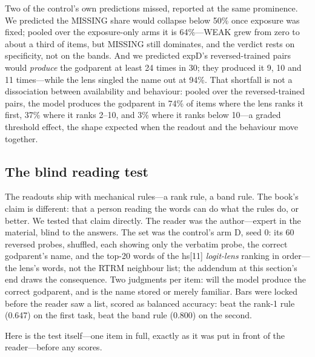 \documentclass[11pt]{article}
\begin{document}
Two of the control's own predictions missed, reported at the same
prominence. We predicted the MISSING share would collapse below 50\%
once exposure was fixed; pooled over the exposure-only arms it is
64\%---WEAK grew from zero to about a third of items, but MISSING
still dominates, and the verdict rests on specificity, not on the
bands. And we predicted expD's reversed-trained pairs would
\emph{produce} the godparent at least 24 times in 30; they produced
it 9, 10 and 11 times---while the lens singled the name out at 94\%.
That shortfall is not a dissociation between availability and
behaviour: pooled over the reversed-trained pairs, the model produces
the godparent in 74\% of items where the lens ranks it first, 37\%
where it ranks 2--10, and 3\% where it ranks below 10---a graded
threshold effect, the shape expected when the readout and the
behaviour move together.

\subsection{The blind reading test}

The readouts ship with mechanical rules---a rank rule, a band rule. The book's claim is different: that a person reading the words can do what the rules do, or better. We tested that claim directly. The reader was the author---expert in the material, blind to the answers. The set was the control's arm D, seed 0: its 60 reversed probes, shuffled, each showing only the verbatim probe, the correct godparent's name, and the top-20 words of the hs[11] \emph{logit-lens} ranking in order---the lens's words, not the RTRM neighbour list; the addendum at this section's end draws the consequence. Two judgments per item: will the model produce the correct godparent, and is the name stored or merely familiar. Bars were locked before the reader saw a list, scored as balanced accuracy: beat the rank-1 rule (0.647) on the first task, beat the band rule (0.800) on the second.

Here is the test itself---one item in full, exactly as it was put
in front of the reader---before any scores.
\end{document}

